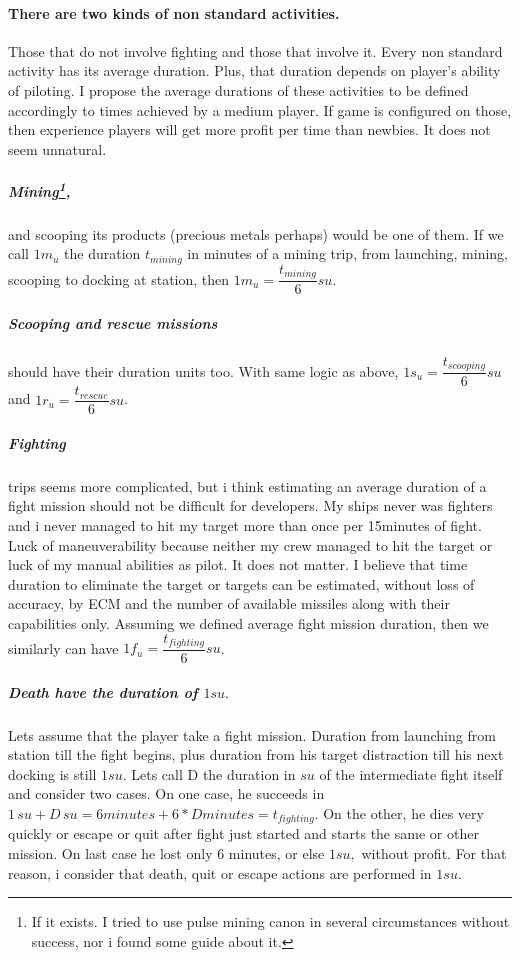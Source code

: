 \documentclass[]{article}
\begin{document}
\paragraph{There are two kinds of non standard activities.} Those that do not involve fighting and those that involve it. Every non standard activity has its average duration. Plus, that duration depends on player's ability of piloting. I propose the average durations of these activities to be defined accordingly to times achieved by a medium player. If game is configured on those, then experience players will get more profit per time than newbies. It does not seem unnatural.
\subparagraph*{Mining\footnote{If it exists. I tried to use pulse mining canon in several circumstances without success, nor i found some guide about it.},} and scooping its products (precious metals perhaps) would be one of them. If we call $ 1m_{u} $ the duration $ t_{mining} $ in minutes of a mining trip, from launching, mining, scooping to docking at station, then $ 1m_{u}=  \dfrac{t_{mining}}{6} su$.
\subparagraph*{Scooping and rescue missions} should have their duration units too. With same logic as above, $ 1s_{u}=\dfrac{t_{scooping}}{6} su$ and $ 1r_{u}=\dfrac{t_{rescue}}{6} su$.
\subparagraph*{Fighting} trips seems more complicated, but i think estimating an average duration of a fight mission should not be difficult for developers. My ships never was fighters and i never managed to hit my target more than once per 15minutes of fight. Luck of maneuverability because neither my crew managed to hit the target or luck of my manual abilities as pilot. It does not matter. I believe that time duration to eliminate the target or targets can be estimated, without loss of accuracy, by ECM and the number of available missiles along with their capabilities only. Assuming we defined average fight mission duration, then we similarly can have  $ 1f_{u}=\dfrac{t_{fighting}}{6} su$.
\subparagraph*{Death have the duration of $1su.$} Lets assume that the player take a fight mission. Duration from launching from station till the fight begins, plus duration from his target distraction till his next docking is still $1su.$ Lets call D the duration in $su$ of the intermediate fight itself and consider two cases. On one case, he succeeds in $1\,su+D\,su=6 minutes+6*D  minutes =t_{fighting}.$ On the other, he dies very quickly or escape or quit after fight just started and starts the same or other mission. On last case he lost only 6 minutes, or else $1su,$ without profit. For that reason, i consider that death, quit or escape actions are performed in $1su.$ 
\end{document}
